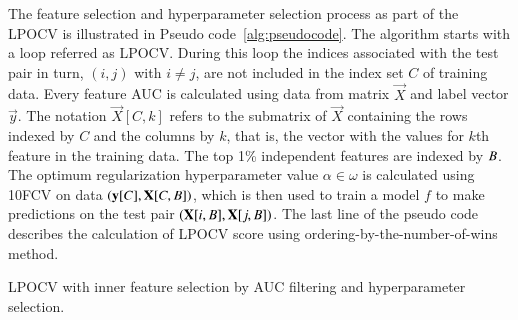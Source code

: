 The feature selection and hyperparameter selection process as part of the LPOCV
is illustrated in Pseudo code~\ref{alg:pseudocode}. The algorithm starts with a
loop referred as LPOCV\@. During this loop the indices associated with the test
pair in turn, $(i,j)$ with $i \neq j$, are not included in the index set $C$ of
training data. Every feature AUC is calculated using data from matrix $\vec{X}$
and label vector $\vec{y}$. The notation $\vec{X}[C,k]$ refers to the submatrix
of $\vec{X}$ containing the rows indexed by $C$ and the columns by $k$, that is,
the vector with the values for $k$th feature in the training data. The top 1\%
independent features are indexed by $B$. The optimum regularization
hyperparameter value $\alpha \in \omega$ is calculated using 10FCV on data
$(\mathbf{y}[C], \mathbf{X}[C,B])$, which is then used to train a model $f$ to
make predictions on the test pair $(\mathbf{X}[i,B], \mathbf{X}[j,B])$. The
last line of the pseudo code describes the calculation of LPOCV score using
ordering-by-the-number-of-wins method.

\begin{algorithm}[!h]
  \caption{LPOCV with inner feature selection by AUC filtering and
  hyperparameter selection.}%
  \label{alg:pseudocode}

  \begin{algorithmic}
      \ENDFOR{}
    \ENDFOR{}
  \end{algorithmic}
\end{algorithm}


